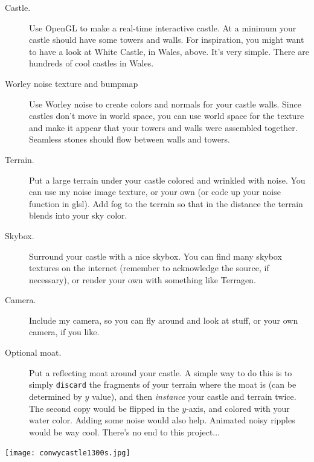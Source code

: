 \documentclass{article}
\begin{document}
\begin{description}

\item[Castle.] Use OpenGL to make a real-time interactive castle.  At
  a minimum your castle should have some towers and walls.  For
  inspiration, you might want to have a look at White Castle, in
  Wales, above.  It's very simple.  There are hundreds of cool castles
  in Wales.  

  \item[Worley noise texture and bumpmap] Use Worley noise to create
    colors and normals for your castle walls.  Since castles don't
    move in world space, you can use world space for the texture and
    make it appear that your towers and walls were assembled
    together.  Seamless stones should flow between walls and towers.

\item[Terrain.] Put a large terrain under your castle
  colored and wrinkled with noise.  You can use my noise image
  texture, or your own (or code up your noise function in glsl).
  Add fog to the terrain so that in the distance the terrain blends
  into your sky color.

\item[Skybox.] Surround your castle with a nice skybox.  You can
  find many skybox textures on the internet (remember to acknowledge
  the source, if necessary), or render your own with something like
  Terragen.
  
\item[Camera.]  Include my camera, so you can fly around and look at
  stuff, or your own camera, if you like.

\item[Optional moat.]  Put a reflecting moat around your castle.  A
  simple way to do this is to simply {\tt discard} the fragments of
  your terrain where the moat is (can be determined by $y$ value), and
  then {\em instance} your castle and terrain twice.  The second copy
  would be flipped in the $y$-axis, and colored with your water color.
  Adding some noise would also help.  Animated noisy ripples would be
  way cool.  There's no end to this project...

\end{description}

\centerline{\texttt{[image: conwycastle1300s.jpg]}}
\end{document}
